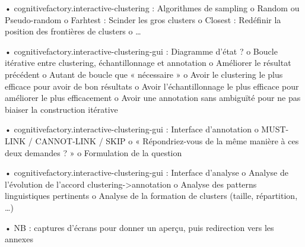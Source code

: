         •	cognitivefactory.interactive-clustering : Algorithmes de sampling
            o	Random ou Pseudo-random
            o	Farhtest : Scinder les gros clusters
            o	Closest : Redéfinir la position des frontières de clusters
            o	…

        •	cognitivefactory.interactive-clustering-gui : Diagramme d'état ?
        		o	Boucle itérative entre clustering, échantillonnage et annotation
            o	Améliorer le résultat précédent
            o	Autant de boucle que « nécessaire »
            o	Avoir le clustering le plus efficace pour avoir de bon résultats
            o	Avoir l’échantillonnage le plus efficace pour améliorer le plus efficacement
            o	Avoir une annotation sans ambiguïté pour ne pas biaiser la construction itérative

        •	cognitivefactory.interactive-clustering-gui : Interface d’annotation
            o	MUST-LINK / CANNOT-LINK / SKIP
            o	« Répondriez-vous de la même manière à ces deux demandes ? »
            o	Formulation de la question

        •	cognitivefactory.interactive-clustering-gui : Interface d’analyse
            o	Analyse de l’évolution de l’accord clustering->annotation
            o	Analyse des patterns linguistiques pertinents
            o	Analyse de la formation de clusters (taille, répartition, …)

        •	NB : captures d’écrans pour donner un aperçu, puis redirection vers les annexes

